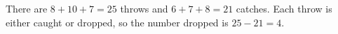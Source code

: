 There are $8+10+7=25$ throws and $6+7+8=21$ catches. Each throw is either caught or dropped, so the number dropped is $25-21=\boxed4$.
